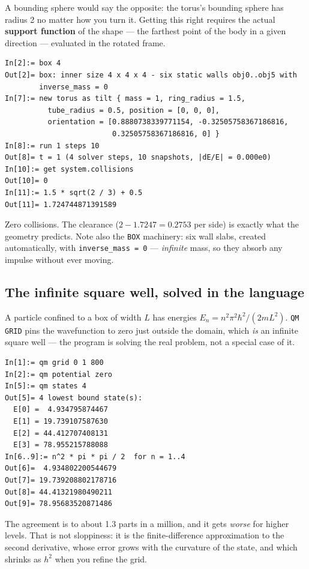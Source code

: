 \documentclass[11pt]{article}
\newcommand{\kw}[1]{\texttt{\uppercase{#1}}}
\newcommand{\code}[1]{\texttt{#1}}
\begin{document}
A bounding sphere would say the opposite: the torus's bounding sphere
has radius 2 no matter how you turn it. Getting this right requires the
actual \textbf{support function} of the shape --- the farthest point of
the body in a given direction --- evaluated in the rotated frame.

\begin{lstlisting}
In[2]:= box 4
Out[2]= box: inner size 4 x 4 x 4 - six static walls obj0..obj5 with
        inverse_mass = 0
In[7]:= new torus as tilt { mass = 1, ring_radius = 1.5,
          tube_radius = 0.5, position = [0, 0, 0],
          orientation = [0.8880738339771154, -0.32505758367186816,
                         0.32505758367186816, 0] }
In[8]:= run 1 steps 10
Out[8]= t = 1 (4 solver steps, 10 snapshots, |dE/E| = 0.000e0)
In[10]:= get system.collisions
Out[10]= 0
In[11]:= 1.5 * sqrt(2 / 3) + 0.5
Out[11]= 1.724744871391589
\end{lstlisting}

Zero collisions. The clearance ($2 - 1.7247 = 0.2753$ per side) is
exactly what the geometry predicts. Note also the \kw{box} machinery:
six wall slabs, created automatically, with \code{inverse\_mass = 0} ---
\emph{infinite} mass, so they absorb any impulse without ever moving.

\subsection{The infinite square well, solved in the language}

A particle confined to a box of width $L$ has energies
$E_n = n^2\pi^2\hbar^2/(2mL^2)$. \kw{qm grid} pins the wavefunction to
zero just outside the domain, which \emph{is} an infinite square well
--- the program is solving the real problem, not a special case of it.

\begin{lstlisting}
In[1]:= qm grid 0 1 800
In[2]:= qm potential zero
In[5]:= qm states 4
Out[5]= 4 lowest bound state(s):
  E[0] =  4.934795874467
  E[1] = 19.739107587630
  E[2] = 44.412707408131
  E[3] = 78.955215788088
In[6..9]:= n^2 * pi * pi / 2  for n = 1..4
Out[6]=  4.934802200544679
Out[7]= 19.739208802178716
Out[8]= 44.41321980490211
Out[9]= 78.95683520871486
\end{lstlisting}

The agreement is to about 1.3 parts in a million, and it gets
\emph{worse} for higher levels. That is not sloppiness: it is the
finite-difference approximation to the second derivative, whose error
grows with the curvature of the state, and which shrinks as $h^2$ when
you refine the grid.
\end{document}
